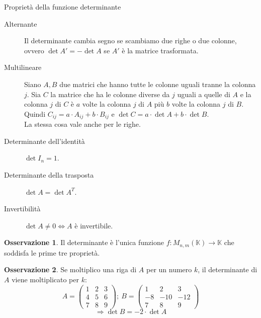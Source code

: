\documentclass[a4paper]{article}
\theoremstyle{definition}
\newtheorem*{oss}{Osservazione}
\begin{document}
\begin{deff}{Proprietà della funzione determinante}{}
	\begin{description}
		\item[Alternante] Il determinante cambia segno se scambiamo due righe o due colonne, ovvero $\det A' = - \det A$ se $A'$ è la matrice trasformata.
		\item[Multilineare] Siano $A, B$ due matrici che hanno tutte le colonne uguali tranne la colonna $j$.
		Sia $C$ la matrice che ha le colonne diverse da $j$ uguali a quelle di $A$ e la colonna $j$ di $C$ è $a$ volte la colonna $j$ di $A$ più $b$ volte la colonna $j$ di $B$. \\
		Quindi $C_{ij} = a \cdot A_{ij} + b \cdot B_{ij}$ e $\det C = a \cdot \det A + b \cdot \det B$. \\
		La stessa cosa vale anche per le righe.
		\item[Determinante dell'identità] $\det I_n = 1$.
		\item[Determinante della trasposta] $\det A = \det A^T$.
		\item[Invertibilità] $\det A \ne 0 \Leftrightarrow A$ è invertibile.
	\end{description}
\end{deff}
\begin{oss}
	Il determinante è l'unica funzione $f: M_{n,m}(\mathbb{K}) \rightarrow \mathbb{K}$ che soddisfa le prime tre proprietà.
\end{oss}

\begin{oss}
	Se moltiplico una riga di $A$ per un numero $k$, il determinante di $A$ viene moltiplicato per $k$:
	\[A = \begin{pmatrix}
		1 & 2 & 3 \\
		4 & 5 & 6 \\
		7 & 8 & 9
	\end{pmatrix}; \ B = \begin{pmatrix}
		1 & 2 & 3 \\
		-8 & -10 & -12 \\
		7 & 8 & 9
	\end{pmatrix} \]
	\[\Rightarrow \det B = - 2 \cdot \det A\]
\end{oss}
\end{document}
